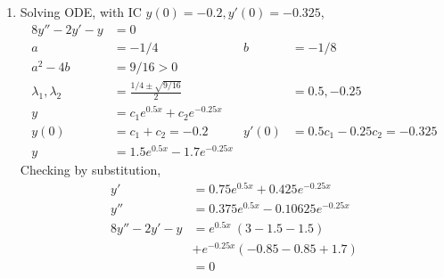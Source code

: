\begin{enumerate}
    \item Solving ODE, with IC $ y(0) = -0.2, y'(0) = -0.325 $,
          \begin{align}
              8y'' - 2y' - y           & = 0                                                                         \\
              a                        & = -1/4                            & b     & = -1/8                          \\
              a^{2} - 4b               & = 9/16 > 0                                                                  \\
              \lambda_{1}, \lambda_{2} & = \frac{1/4 \pm \sqrt{9/16}}{2}   &       & = 0.5, -0.25                    \\
              y                        & = c_{1}e^{0.5x} + c_{2}e^{-0.25x}                                           \\
              y(0)                     & = c_{1} + c_{2} = -0.2            & y'(0) & = 0.5c_{1} - 0.25c_{2} = -0.325 \\
              y                        & = 1.5e^{0.5x} - 1.7e^{-0.25x}
          \end{align}
          Checking by substitution,
          \begin{align}
              y'             & = 0.75e^{0.5x} + 0.425e^{-0.25x}    \\
              y''            & =  0.375e^{0.5x} -0.10625e^{-0.25x} \\
              8y'' - 2y' - y & = e^{0.5x}\ (3  - 1.5 - 1.5)        \\
                             & + e^{-0.25x}(-0.85 - 0.85 + 1.7)    \\
                             & = 0
          \end{align}


\end{enumerate}
